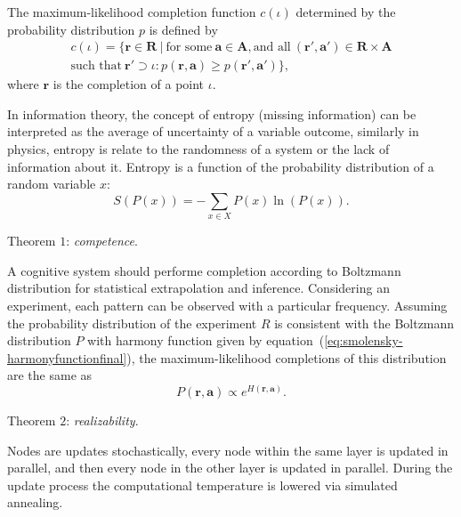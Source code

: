 The maximum-likelihood completion function $c(\iota)$ determined by the probability distribution $p$ is defined by
\begin{equation}
    \label{eq:smolensky-maxcompletion}
    \begin{split}
        c(\iota) = \{\mathbf{r} \in \mathbf{R} \: | \: \text{for some} \: \mathbf{a} \in \mathbf{A}, \text{and all} \: (\mathbf{r}', \mathbf{a}') \in \mathbf{R} \times \mathbf{A} \\
        \text{such that} \: \mathbf{r}' \supset \iota: p(\mathbf{r}, \mathbf{a}) \geqslant p(\mathbf{r}', \mathbf{a}') \},
   \end{split}
\end{equation}
where $\mathbf{r}$ is the completion of a point $\iota$.

In information theory, the concept of entropy (missing information) can be interpreted as the average of uncertainty of a variable outcome, similarly in physics, entropy is relate to the randomness of a system or the lack of information about it.
Entropy is a function of the probability distribution of a random variable $x$:
\begin{equation}
    \label{eq:smolensky-entropy}
    S(P(x)) = - \sum_{x \in X} P(x) \ln{(P(x))}.
\end{equation}

Theorem $1$: \textit{competence}.

A cognitive system should performe completion according to Boltzmann distribution for statistical extrapolation and inference.
Considering an experiment, each pattern can be observed with a particular frequency.
Assuming the probability distribution of the experiment $R$ is consistent with the Boltzmann distribution $P$ with harmony function given by equation~(\ref{eq:smolensky-harmonyfunctionfinal}), the maximum-likelihood completions of this distribution are the same as
\begin{equation}
    \label{eq:smolensky-teo1}
    P(\mathbf{r}, \mathbf{a}) \propto e^{H(\mathbf{r}, \mathbf{a})}.
\end{equation}

Theorem $2$: \textit{realizability}.

Nodes are updates stochastically, every node within the same layer is updated in parallel, and then every node in the other layer is updated in parallel.
During the update process the computational temperature is lowered via simulated annealing.
